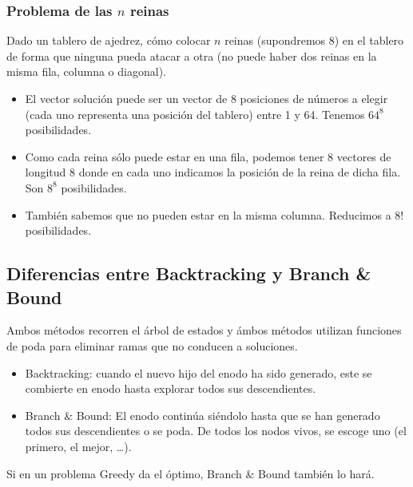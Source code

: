 \subsubsection{Problema de las $n$ reinas}
Dado un tablero de ajedrez, cómo colocar $n$ reinas (supondremos 8) en el tablero de forma que ninguna pueda atacar a otra (no puede haber dos reinas en la misma fila, columna o diagonal).

\begin{itemize}
    \item El vector solución puede ser un vector de 8 posiciones de números a elegir (cada uno representa una posición del tablero) entre 1 y 64. Tenemos $64^8$ posibilidades.
    \item Como cada reina sólo puede estar en una fila, podemos tener 8 vectores de longitud 8 donde en cada uno indicamos la posición de la reina de dicha fila. Son $8^8$ posibilidades.
    \item También sabemos que no pueden estar en la misma columna. Reducimos a $8!$ posibilidades.
\end{itemize}

\subsection{Diferencias entre Backtracking y Branch \& Bound}
Ambos métodos recorren el árbol de estados y ámbos métodos utilizan funciones de poda para eliminar ramas que no conducen a soluciones.

\begin{itemize}
    \item Backtracking: cuando el nuevo hijo del enodo ha sido generado, este se combierte en enodo hasta explorar todos sus descendientes.
    \item Branch \& Bound: El enodo continúa siéndolo hasta que se han generado todos sus descendientes o se poda. De todos los nodos vivos, se escoge uno (el primero, el mejor, \ldots).
\end{itemize}
Si en un problema Greedy da el óptimo, Branch \& Bound también lo hará.
